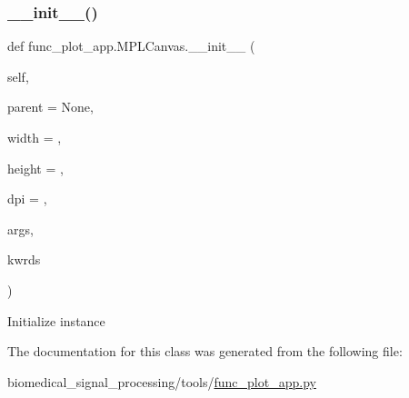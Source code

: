 \subsubsection{\texorpdfstring{\+\_\+\+\_\+init\+\_\+\+\_\+()}{\_\_init\_\_()}}
{\footnotesize\ttfamily def func\+\_\+plot\+\_\+app.\+M\+P\+L\+Canvas.\+\_\+\+\_\+init\+\_\+\+\_\+ (\begin{DoxyParamCaption}\item[{}]{self,  }\item[{}]{parent = {\ttfamily None},  }\item[{}]{width = {},  }\item[{}]{height = {},  }\item[{}]{dpi = {},  }\item[{}]{args,  }\item[{}]{kwrds }\end{DoxyParamCaption})}

\begin{DoxyVerb}Initialize instance
\end{DoxyVerb}
 

The documentation for this class was generated from the following file\+:\begin{DoxyCompactItemize}
\item 
biomedical\+\_\+signal\+\_\+processing/tools/\hyperlink{func__plot__app_8py}{func\+\_\+plot\+\_\+app.\+py}\end{DoxyCompactItemize}
